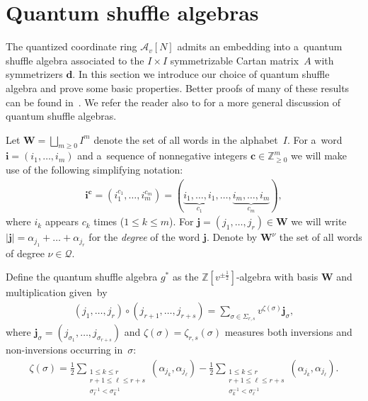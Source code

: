 \documentclass[11pt]{article}
\numberwithin{equation}{section}
\begin{document}
\setcounter{section}{5}
\setcounter{subsection}{1}
\setcounter{subsubsection}{0}
\setcounter{Theorem}{9}
\setcounter{equation}{1}
\section{Quantum shuf\/f\/le algebras}\label{sec:shuffle}

The quantized coordinate ring $\mathcal{A}_v[N]$ admits an embedding into a~quantum shuf\/f\/le algebra associated to the
$I\times I$ symmetrizable Cartan matrix~$A$ with symmetrizers $\mathbf{d}$.
In this section we introduce our choice of quantum shuf\/f\/le algebra and prove some basic properties.
Better proofs of many of these results can be found in~\cite{leclerc}.
We refer the reader also to \cite{Rosso} for a more general discussion of quantum shuf\/f\/le algebras.


Let $\mathbf{W}=\bigsqcup\limits_{m\ge0} I^m$ denote the set of all words in the alphabet~$I$.
For a~word $\mathbf{i}=(i_1,\ldots,i_m)$ and a~sequence of nonnegative integers $\mathbf{c}\in\mathbb{Z}_{\ge0}^m$ we
will make use of the following simplifying notation:
\begin{gather*}
\mathbf{i}^\mathbf{c}=(i_1^{c_1},\ldots,i_m^{c_m})=(\underbrace{i_1,\ldots,
i_1}_{c_1},\ldots,\underbrace{i_m,\ldots,i_m}_{c_m}),
\end{gather*}
where $i_k$ appears $c_k$ times ($1\le k\le m$).
For $\mathbf{j}=(j_1,\ldots,j_r)\in\mathbf{W}$ we will write $|\mathbf{j}|=\alpha_{j_1}+\dots+\alpha_{j_r}$ for the
\emph{degree} of the word $\mathbf{j}$.
Denote by $\mathbf{W}^\nu$ the set of all words of degree $\nu\in\mathcal{Q}$.

Def\/ine the quantum shuf\/f\/le algebra $g^*$ as the $\mathbb{Z}[v^{\pm\frac{1}{2}}]$-algebra with basis $\mathbf{W}$ and
multiplication given~by
\begin{gather}
\label{eq:shuffle_product}
(j_1,\ldots,j_r)\circ(j_{r+1},\ldots,j_{r+s})=\sum\limits_{\sigma\in\Sigma_{r,s}}v^{\zeta(\sigma)}\mathbf{j}_\sigma,
\end{gather}
where $\mathbf{j}_\sigma=(j_{\sigma_1},\ldots,j_{\sigma_{r+s}})$ and $\zeta(\sigma)=\zeta_{r,s}(\sigma)$ measures both
inversions and non-inversions occurring in~$\sigma$:
\begin{gather*}
\zeta(\sigma)=\frac{1}{2}\sum\limits_{\substack{1\le k\le r
\\
r+1\le \ell\le r+s
\\
\sigma^{-1}_\ell<\sigma^{-1}_k}}(\alpha_{j_k},\alpha_{j_\ell})-\frac{1}{2}\sum\limits_{\substack{1\le k\le r
\\
r+1\le \ell\le r+s
\\
\sigma^{-1}_k<\sigma^{-1}_\ell}}(\alpha_{j_k},\alpha_{j_\ell}).
\end{gather*}
\end{document}
